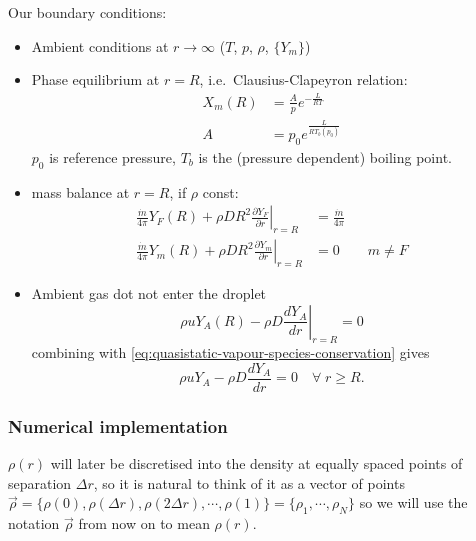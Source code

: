 \documentclass[12pt]{report}
\begin{document}
Our boundary conditions:
\begin{itemize}
\item Ambient conditions at $r \to \infty$ ($T$, $p$, $\rho$, $\{ Y_m \}$)
\item Phase equilibrium at $r = R$, i.e.\ Clausius-Clapeyron relation:
  \begin{align}
    X_m(R) &= \frac{A}{p} e^{-\frac{L}{RT}} \\
    A &= p_0 e^{\frac{L}{RT_b(p_0)}}
  \end{align}
  $p_0$ is reference pressure, $T_b$ is the (pressure dependent) boiling point.
\item mass balance at $r = R$, if $\rho$ const:
  \begin{align}
    \frac{\dot{m}}{4\pi} Y_F(R) + \rho D R^2 \left. \frac{\partial Y_F}{\partial r} \right|_{r=R} &= \frac{\dot{m}}{4\pi} \\
    \frac{\dot{m}}{4\pi} Y_m(R) + \rho D R^2 \left. \frac{\partial Y_m}{\partial r} \right|_{r=R} &= 0 \qquad m \ne F
  \end{align}
\item Ambient gas dot not enter the droplet
  \begin{equation}
    \rho u Y_A(R) - \rho D \left.\frac{d Y_A}{dr}\right|_{r=R} = 0
  \end{equation}
  combining with \eqref{eq:quasistatic-vapour-species-conservation} gives
  \begin{equation}
    \rho u Y_A - \rho D \frac{d Y_A}{dr} = 0 \quad \forall \; r \ge R.
  \end{equation}
\end{itemize}

\subsubsection{Numerical implementation}

$\rho(r)$ will later be discretised into the density at equally spaced points of separation $\Delta r$, so it is natural to think of it as a vector of points $\vec{\rho} = \{\rho(0), \rho(\Delta r), \rho(2 \Delta r), \cdots, \rho(1)\} = \{\rho_1, \cdots, \rho_N\}$ so we will use the notation $\vec{\rho}$ from
now on to mean $\rho(r)$.
\end{document}

